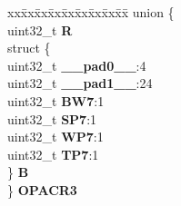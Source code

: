 \begin{DoxyCompactItemize}
\begin{tabbing}
\end{tabbing}\item 
\mbox{\label{structPBRIDGE__B__tag_a41df6cc03a2e63d4a3503d8f7012dd4b}} 
\begin{tabbing}
xx\=xx\=xx\=xx\=xx\=xx\=xx\=xx\=xx\=\kill
union \{\\
\>uint32\_t {\bfseries R}\\
\>struct \{\\
\>\>uint32\_t {\bfseries \_\_pad0\_\_}:4\\
\>\>uint32\_t {\bfseries \_\_pad1\_\_}:24\\
\>\>uint32\_t {\bfseries BW7}:1\\
\>\>uint32\_t {\bfseries SP7}:1\\
\>\>uint32\_t {\bfseries WP7}:1\\
\>\>uint32\_t {\bfseries TP7}:1\\
\>\} {\bfseries B}\\
\} {\bfseries OPACR3}\\


\end{tabbing}
\end{DoxyCompactItemize}
